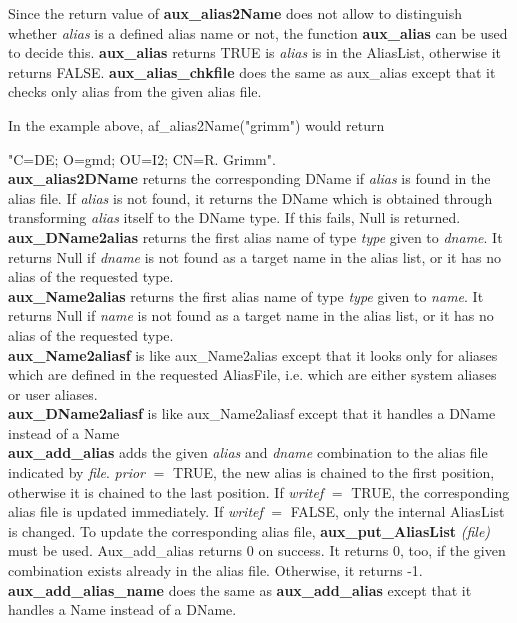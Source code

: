 Since the return value of {\bf aux\_alias2Name} does not allow to distinguish whether
{\em alias} is a defined alias name or not, the function {\bf aux\_alias} can be
used to decide this. {\bf aux\_alias} returns TRUE is {\em alias} is in the AliasList,
otherwise it returns FALSE. {\bf aux\_alias\_chkfile} does the same as aux\_alias
except that it checks only alias from the given alias file.

In the example above, af\_alias2Name("grimm") would return 

"C=DE; O=gmd; OU=I2; CN=R. Grimm".
\\ [1em]
{\bf aux\_alias2DName} returns the corresponding DName if {\em alias} is found in
the alias file. If {\em alias} is not found, 
it returns the DName which is obtained
through transforming {\em alias} itself to the DName type. If this fails, Null is
returned.
\\ [1em]
{\bf aux\_DName2alias} returns the first alias name of type {\em type} given to {\em dname}.
It returns Null if {\em dname} is not found as a target name in the alias list, 
or it has no
alias of the requested type. 
\\ [1em]
{\bf aux\_Name2alias} returns the first alias name of type {\em type} given to {\em name}.
It returns Null if {\em name} is not found as a target name in the alias list, 
or it has no
alias of the requested type. 
\\ [1em]
{\bf aux\_Name2aliasf} is like aux\_Name2alias except that it looks only for aliases
which are defined in the requested AliasFile, i.e. which are either system aliases
or user aliases. 
\\ [1em]
{\bf aux\_DName2aliasf} is like aux\_Name2aliasf except that it handles a DName
instead of a Name
\\ [1em]
{\bf aux\_add\_alias} adds the given {\em alias} and {\em dname} combination to
the alias file indicated by {\em file}. {\em prior} $=$ TRUE, the new alias is
chained to the first position, otherwise it is chained to the last position.
If {\em writef} $=$ TRUE, the corresponding alias file is updated immediately.
If {\em writef} $=$ FALSE, only the internal AliasList is changed. To update
the corresponding alias file, {\bf aux\_put\_AliasList} {\em (file)} must be
used. Aux\_add\_alias returns 0 on success. It returns 0, too, if the
given combination exists already in the alias file. Otherwise, it returns -1.
\\ [1em]
{\bf aux\_add\_alias\_name} does the same as {\bf aux\_add\_alias} except that
it handles a Name instead of a DName.
